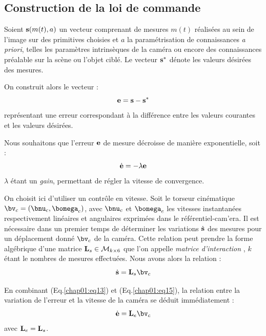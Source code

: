 \subsection{Construction de la loi de commande} \label{chap1-2-0}

Soient ${\bf s}(m(t), a)$ un vecteur comprenant de mesures $m(t)$ réalisées au 
sein de l'image sur des primitives choisies et $a$ la param\'etrisation de 
connaissances {\it a priori}, telles les param\`etres intrins\`eques de la 
cam\'era ou encore des connaissances pr\'ealable sur la sc\`ene ou l'objet 
cibl\'e. Le vecteur ${\bf s}^*$ d\'enote les valeurs désirées des mesures.

On construit alors le vecteur :
\begin{equation}
{\bf e} = {\bf s} - {\bf s}^*
\label{chap01:eq13}
\end{equation}
représentant une erreur correspondant \`a la différence entre les valeurs 
courantes et les valeurs désirées.

Nous souhaitons que l'erreur ${\bf e}$ de mesure décroisse de manière 
exponentielle, soit :
\begin{equation}
\dot {\bf e} = - \lambda {\bf e}
\label{chap01:eq14}
\end{equation}
$\lambda$ étant un {\it gain}, permettant de régler la vitesse de convergence.

On choisit ici d'utiliser un contr\^ole en vitesse. Soit le torseur cinématique 
$\bv_c = (\bnu_c, \bomega_c)$, avec $\bnu_c$ et $\bomega_c$ les vitesses 
instantanées respectivement linéaires et angulaires exprim\'ees dans le 
r\'ef\'erentiel-cam'era. Il est nécessaire dans un premier temps de déterminer 
les variations $\dot {\bf s}$ des mesures pour un déplacement donné $\bv_c$ de 
la caméra. Cette relation peut prendre la forme algébrique d'une matrice ${\bf 
L}_s \in \mathcal M_{k\times 6}$ que l'on appelle {\it matrice d'interaction} 
\cite{espiau1992}, $k$ \'etant le nombres de mesures effectuées. Nous avons 
alors la relation :
\begin{equation}
\dot {\bf s} = {\bf L}_s \bv_c
\label{chap01:eq15}
\end{equation}

En combinant (Eq.\ref{chap01:eq13}) et (Eq.\ref{chap01:eq15}), la relation 
entre la variation de l'erreur et la vitesse de la cam\'era se d\'eduit 
imm\'ediatement :
\begin{equation}
\dot {\bf e} = {\bf L}_e \bv_c
\label{chap01:eq16}
\end{equation}
avec ${\bf L}_e = {\bf L}_s$.

